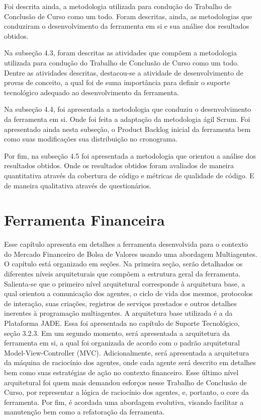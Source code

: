Foi descrita ainda, a metodologia utilizada para condução do Trabalho de Conclusão de Curso como um todo. Foram descritas, ainda, as metodologias que conduziram o desenvolvimento da ferramenta em si e sua análise dos resultados obtidos.

Na subseção 4.3, foram descritas as atividades que compõem a metodologia utilizada para condução do Trabalho de Conclusão de Curso como um todo. Dentre as atividades descritas, destacou-se a atividade de desenvolvimento de provas de conceito, a qual foi de suma importância para definir o suporte tecnológico adequado ao desenvolvimento da ferramenta.   

Na subseção 4.4, foi apresentada a metodologia que conduziu o desenvolvimento da ferramenta em si. Onde foi feita a adaptação da metodologia ágil Scrum. Foi apresentado ainda nesta subseção, o Product Backlog inicial da ferramenta bem como suas modificações sua distribuição no cronograma.

Por fim, na subseção 4.5 foi apresentada a metodologia que orientou a análise dos resultados obtidos. Onde os resultados obtidos foram avaliados de maneira quantitativa através da cobertura de código e métricas de qualidade de código. E de maneira qualitativa através de questionários.


\newpage
\chapter[FERRAMENTA FINANCEIRA]{Ferramenta Financeira}

Esse capítulo apresenta em detalhes a ferramenta desenvolvida para o contexto do Mercado Financeiro de Bolsa de Valores usando uma abordagem Multiagentes. O capítulo está organizado em seções. Na primeira seção, serão detalhados os diferentes níveis arquiteturais que compõem a estrutura geral da ferramenta. Salienta-se que o primeiro nível arquitetural corresponde à arquitetura base, a qual orientou a comunicação dos agentes, o ciclo de vida dos mesmos, protocolos de interação, suas criações, registros de serviços prestados e outros detalhes inerentes à programação multiagentes. A arquitetura base utilizada é a da Plataforma JADE. Essa foi apresentada no capítulo de Suporte Tecnológico, seção 3.2.3. Em um segundo momento, será apresentada a arquitetura da ferramenta em si, a qual foi organizada de acordo com o padrão arquitetural Model-View-Controller (MVC). Adicionalmente, será apresentada a arquitetura da máquina de raciocínio dos agentes, onde cada agente será descrito em detalhes bem como suas estratégias de ação no contexto financeiro. Esse último nível arquitetural foi quem mais demandou esforços nesse Trabalho de Conclusão de Curso, por representar a lógica de raciocínio dos agentes, e, portanto, o core da ferramenta. Por fim, é acordada uma abordagem evolutiva, visando facilitar a manutenção bem como a refatoração da ferramenta.

